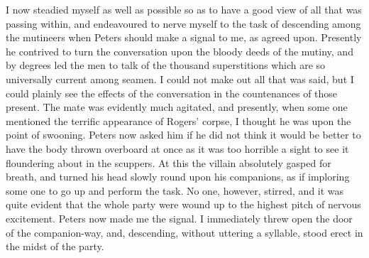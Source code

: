 I now steadied myself as well as possible so as to have a good view of all
that was passing within, and endeavoured to nerve myself to the task of
descending among the mutineers when Peters should make a signal to me, as agreed
upon. Presently he contrived to turn the conversation upon the bloody deeds of
the mutiny, and by degrees led the men to talk of the thousand superstitions
which are so universally current among seamen. I could not make out all that was
said, but I could plainly see the effects of the conversation in the
countenances of those present. The mate was evidently much agitated, and
presently, when some one mentioned the terrific appearance of Rogers' corpse, I
thought he was upon the point of swooning. Peters now asked him if he did not
think it would be better to have the body thrown overboard at once as it was too
horrible a sight to see it floundering about in the scuppers. At this the
villain absolutely gasped for breath, and turned his head slowly round upon his
companions, as if imploring some one to go up and perform the task. No one,
however, stirred, and it was quite evident that the whole party were wound up to
the highest pitch of nervous excitement. Peters now made me the signal. I
immediately threw open the door of the companion-way, and, descending, without
uttering a syllable, stood erect in the midst of the party. 

